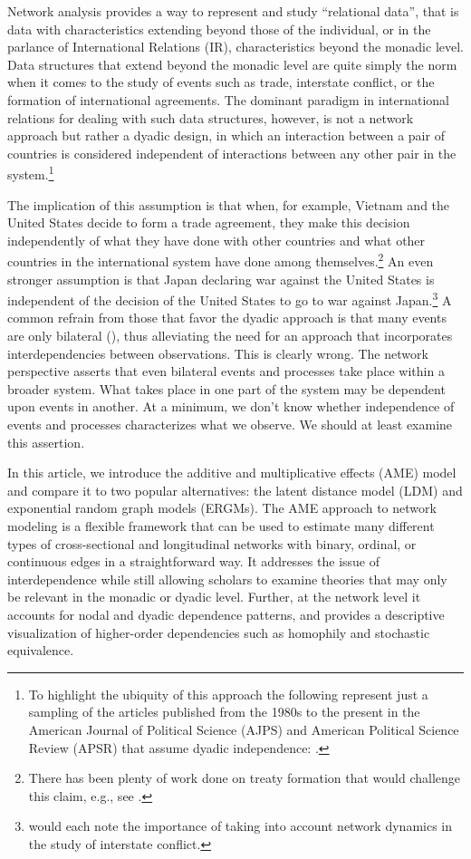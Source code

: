 \documentclass[12pt,pdflatex]{elsarticle}
\begin{document}
Network analysis provides a way to represent and study ``relational data'', that is data with characteristics extending beyond those of the individual, or in the parlance of International Relations (IR), characteristics beyond the monadic level. Data structures that extend beyond the monadic level are quite simply the norm when it comes to the study of events such as trade, interstate conflict, or the formation of international agreements. The dominant paradigm in  international relations for dealing with such data structures, however, is not a network approach but rather a dyadic design, in which an interaction between a pair of countries is considered independent of interactions between any other pair in the system.\footnote{To highlight the ubiquity of this approach the following represent just a sampling of the articles published from the 1980s to the present in the American Journal of Political Science (AJPS) and American Political Science Review (APSR) that assume dyadic independence: \citet{dixon:1983,mansfield:etal:2000,lemke:reed:2001a,mitchell:2002,dafoe:2011a,fuhrmann:sechser:2014,carnegie:2014}.} 

The implication of this assumption is that when, for example, Vietnam and the United States decide to form a trade agreement, they make this decision independently of what they have done with other countries and what other countries in the international system have done among themselves.\footnote{There has been plenty of work done on treaty formation that would challenge this claim, e.g., see \citet{manger:etal:2012,kinne:2013}.} An even stronger assumption is that Japan declaring war against the United States is independent of the decision of the United States to go to war against Japan.\footnote{\citet{maoz:etal:2006,ward:etal:2007,minhas:etal:2016} would each note the importance of taking into account network dynamics in the study of interstate conflict.} A common refrain from those that favor the dyadic approach is that many events are only bilateral (\citealt{diehl:wright:2016}), thus alleviating the need for an approach that incorporates interdependencies between observations. This is clearly wrong. The network perspective asserts that even bilateral events and processes take place within a broader system. What takes place in one part of the system may be dependent upon events in another. At a minimum, we don't know whether independence of events and processes characterizes what we observe. We should at least examine this assertion.  

In this article, we introduce the additive and multiplicative effects (AME) model and compare it to two popular alternatives: the latent distance model (LDM) and exponential random graph models (ERGMs). The AME approach to network modeling is a flexible framework that can be used to estimate many different types of cross-sectional and longitudinal networks with binary, ordinal, or continuous edges in a straightforward way. It addresses the issue of interdependence while still allowing scholars to examine theories that may only be relevant in the monadic or dyadic level. Further, at the network level it accounts for nodal and dyadic dependence patterns, and provides a descriptive visualization of higher-order dependencies such as homophily and stochastic equivalence. 
\end{document}
